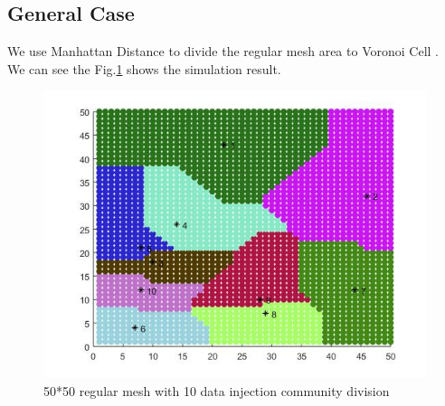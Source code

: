 \subsection{General Case}

We use Manhattan Distance to divide the regular mesh area to Voronoi Cell \cite{fortune1987sweepline}.
\\
We can see the Fig.\ref{voronoi} shows the simulation result.

\begin{figure}[h]
\centering\includegraphics[width=0.8\linewidth]{figure/voronoi}
\caption{50*50 regular mesh with 10 data injection community division}
\label{voronoi}
\end{figure}

\vspace*{50pt}